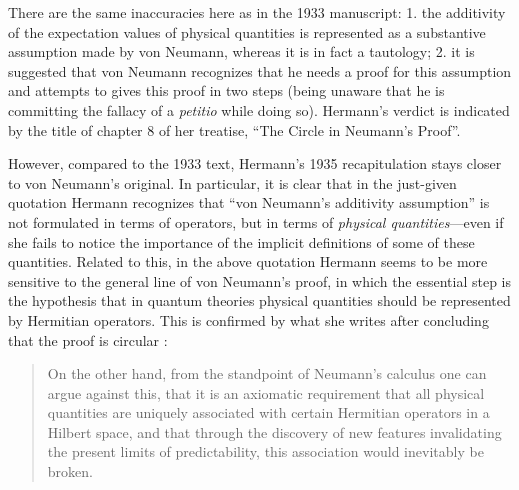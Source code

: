 \documentclass[12pt]{article}
\begin{document}
There are the same inaccuracies here as in the 1933 manuscript: 1. the additivity of the expectation values of physical quantities is represented as a substantive assumption made by von Neumann, whereas it is in fact a tautology; 2. it is suggested that von Neumann recognizes that he needs a proof for this assumption and attempts to gives this proof in two steps (being unaware that he is committing the fallacy of a \emph{petitio} while doing so). Hermann's verdict is indicated by the title of chapter 8 of her treatise, ``The Circle in Neumann's Proof''.

However, compared to the 1933 text, Hermann's 1935 recapitulation stays closer to von Neumann's original. In particular, it is clear that in the just-given quotation Hermann recognizes that ``von Neumann's additivity assumption'' is not formulated in terms of operators, but in terms of \emph{physical quantities}---even if she fails to notice the importance of the implicit definitions of some of these quantities. Related to this, in the above quotation Hermann seems to be more sensitive to the general line of von Neumann's proof, in which the essential step is the hypothesis that in quantum theories physical quantities should be represented by Hermitian operators. This is confirmed by what she writes after concluding that the proof is circular \cite[p.\@ 269]{crull}:
\begin{quote}
On the other hand, from the standpoint of Neumann's calculus one can argue
against this, that it is an axiomatic requirement that all physical
quantities are uniquely associated with certain Hermitian operators in a Hilbert
space, and that through the discovery of new features invalidating the present limits
of predictability, this association would inevitably be broken.
\end{quote}
\end{document}
